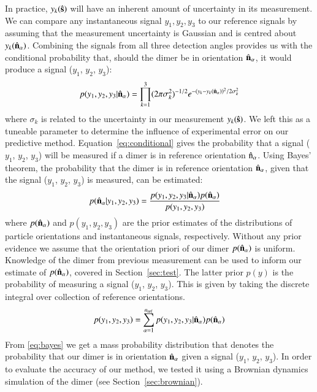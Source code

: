 \documentclass[final,  3p]{elsarticle}
\begin{document}
In practice, $y_k(\hat{\bf s})$ will have an inherent amount of uncertainty in its measurement. We can compare any instantaneous signal $y_1, y_2, y_3$ to our reference signals by assuming that the measurement uncertainty is Gaussian and is centred about $y_k(\hat{\bf n}_\alpha)$.
%
Combining the signals from all three detection angles provides us with the conditional probability that, should the dimer be in orientation
$\hat{\bf n}_\alpha$, it would produce a signal ($y_1$, $y_2$, $y_3$):
\begin{align}
\label{eq:conditional}
  p(y_1, y_2, y_3|\hat{\bf n}_\alpha)
  = \prod^3_{k=1}
(2\pi\sigma_k^2)^{-1/2} 
e^{-(y_{k}-y_{k}(\hat{\bf n}_\alpha))^2/2\sigma_k^2}
\end{align}
where $\sigma_k$ is related to the uncertainty in our measurement $y_k(\hat{\bf s})$. We left this as a tuneable parameter to determine the influence of experimental error on our predictive method. Equation~\eqref{eq:conditional} gives the probability that a signal ($y_1$, $y_2$, $y_3$) will be measured if a dimer is in reference orientation $\hat{\rm n}_\alpha$. Using Bayes' theorem, the probability that the dimer is in reference orientation $\hat{\bf n}_\alpha$, given that the signal ($y_1$, $y_2$, $y_3$) is measured, can be estimated:
\begin{align}
  \label{eq:bayes}
  p(\hat{\bf n}_\alpha| y_1,y_2,y_3)
  &=
    \frac{p(y_1,y_2,y_3|\hat{\bf n}_\alpha)
    p(\hat{\bf n}_\alpha)}{p(y_1, y_2, y_3)}
\end{align}
where $p(\hat{\bf n}_\alpha)$ and $p(y_1, y_2, y_3)$ are the prior estimates of the distributions of particle orientations and instantaneous signals, respectively.
%
Without any prior evidence we assume that the orientation priori of our dimer
$p(\hat{\bf n}_{\alpha})$ is uniform. Knowledge of the dimer from previous
measurement can be used to inform our estimate of $p(\hat{\bf n}_{\alpha})$, covered in Section~\ref{sec:test}.  The latter prior $p(y)$ is the probability of measuring a signal ($y_1$, $y_2$, $y_3$).  This is given by taking the discrete integral over collection of reference orientations.
\begin{align}
  p(y_1, y_2, y_3)
  =
  \sum_{\alpha=1}^{n_{\rm ref}}
  p(y_1, y_2, y_3|\hat{\bf n}_\alpha)
  p(\hat{\bf n}_\alpha)
\end{align}
From \eqref{eq:bayes} we get a mass probability distribution that denotes the
probability that our dimer is in orientation $\hat{\bf n}_{\alpha}$ given a
signal ($y_1$, $y_2$, $y_3$). In order to evaluate the accuracy of our method, we tested it using a Brownian dynamics simulation of the dimer (see Section~\ref{sec:brownian}).
\end{document}
